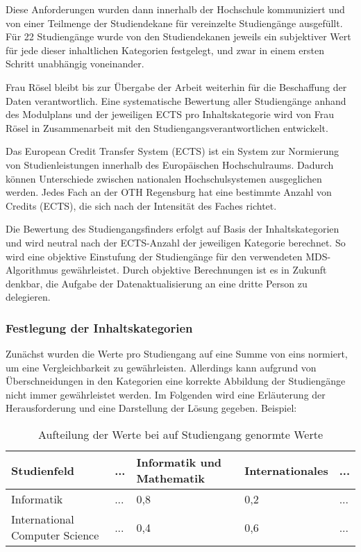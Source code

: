 Diese Anforderungen wurden dann innerhalb der Hochschule kommuniziert und von einer Teilmenge der Studiendekane für vereinzelte Studiengänge ausgefüllt. Für 22 Studiengänge wurde von den Studiendekanen jeweils ein subjektiver Wert für jede dieser inhaltlichen Kategorien festgelegt, und zwar in einem ersten Schritt unabhängig voneinander. %

Frau Rösel bleibt bis zur Übergabe der Arbeit weiterhin für die Beschaffung der Daten verantwortlich. Eine systematische Bewertung aller Studiengänge anhand des Modulplans und der jeweiligen ECTS pro Inhaltskategorie wird von Frau Rösel in Zusammenarbeit mit den Studiengangsverantwortlichen entwickelt.

Das European Credit Transfer System (ECTS) ist ein System zur Normierung von Studienleistungen innerhalb des Europäischen Hochschulraums. Dadurch können Unterschiede zwischen nationalen Hochschulsystemen ausgeglichen werden. \parencite{european_commission_europaisches_nodate} Jedes Fach an der OTH Regensburg hat eine bestimmte Anzahl von Credits (ECTS), die sich nach der Intensität des Faches richtet.

Die Bewertung des Studiengangsfinders erfolgt auf Basis der Inhaltskategorien und wird neutral nach der ECTS-Anzahl der jeweiligen Kategorie berechnet. So wird eine objektive Einstufung der Studiengänge für den verwendeten MDS-Algorithmus gewährleistet. Durch objektive Berechnungen ist es in Zukunft denkbar, die Aufgabe der Datenaktualisierung an eine dritte Person zu delegieren.

\subsubsection{Festlegung der Inhaltskategorien}
Zunächst wurden die Werte pro Studiengang auf eine Summe von eins normiert, um eine Vergleichbarkeit zu gewährleisten. Allerdings kann aufgrund von Überschneidungen in den Kategorien eine korrekte Abbildung der Studiengänge nicht immer gewährleistet werden. Im Folgenden wird eine Erläuterung der Herausforderung und eine Darstellung der Lösung gegeben.\newline
Beispiel:

\begin{table}[!ht]
    \centering
    \begin{tabular}{|l|l|l|l|l|}
    \hline
    \textbf{Studienfeld}           & \textbf{...} & \textbf{Informatik und Mathematik} & \textbf{Internationales} & \textbf{...} \\ \hline
    Informatik                     & ...          & 0,8                                & 0,2                      & ...          \\ \hline
    International Computer Science & ...          & 0,4                                & 0,6                      & ...          \\ \hline
    \end{tabular}

    \caption{Aufteilung der Werte bei auf Studiengang genormte Werte}
    \label{table:norm-values}
\end{table}

